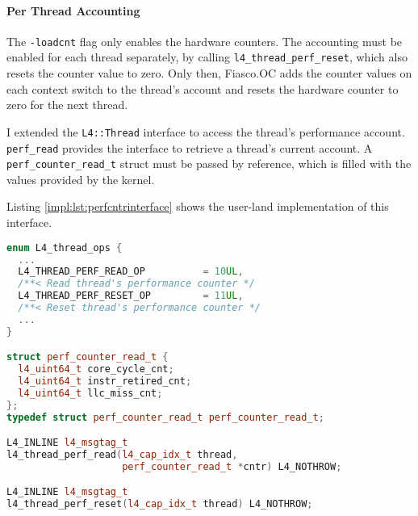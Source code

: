 \paragraph{Per Thread Accounting}
The \texttt{-loadcnt} flag only enables the hardware counters.
The accounting must be enabled for each thread separately, by calling
\texttt{l4\_thread\_perf\_reset}, which also resets the counter value to zero.
Only then, Fiasco.OC adds the counter values on each context switch to the
thread's account and resets the hardware counter to zero for the next thread.

I extended the \texttt{L4::Thread} interface to access the thread's performance
account.
\texttt{perf\_read} provides the interface to retrieve a thread's current
account.
A \texttt{perf\_counter\_read\_t} struct must be passed by reference, which
is filled with the values provided by the kernel.

Listing \ref{impl:lst:perfcntrinterface} shows the user-land implementation of
this interface.

\begin{lstlisting}[language=c++,
  caption={User land interface for retrieving and resetting a thread's
    performance counters; UTCB-pointer left out for brevity.},
  label={impl:lst:perfcntrinterface}]
enum L4_thread_ops {
  ...
  L4_THREAD_PERF_READ_OP	      = 10UL,
  /**< Read thread's performance counter */
  L4_THREAD_PERF_RESET_OP	      =	11UL,
  /**< Reset thread's performance counter */
  ...
}

struct perf_counter_read_t {
  l4_uint64_t core_cycle_cnt;
  l4_uint64_t instr_retired_cnt;
  l4_uint64_t llc_miss_cnt;
};
typedef struct perf_counter_read_t perf_counter_read_t;

L4_INLINE l4_msgtag_t
l4_thread_perf_read(l4_cap_idx_t thread,
                    perf_counter_read_t *cntr) L4_NOTHROW;

L4_INLINE l4_msgtag_t
l4_thread_perf_reset(l4_cap_idx_t thread) L4_NOTHROW;
\end{lstlisting}
